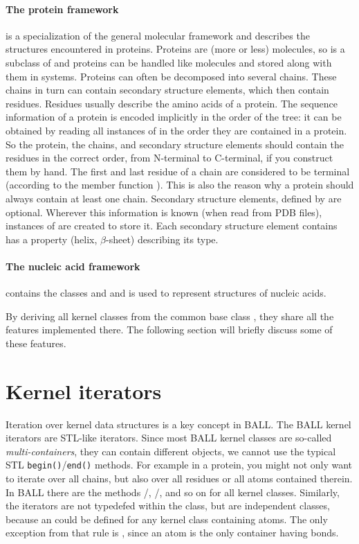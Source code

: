 \paragraph{The protein framework}is a specialization of the general molecular
framework and describes the structures encountered in proteins. Proteins are
(more or less) molecules, so  is a subclass of 
and proteins can be handled like molecules and stored along with them in
systems. Proteins can often be decomposed into several chains. These chains in
turn can contain secondary structure elements, which then contain residues.
Residues usually describe the amino acids of a protein. The sequence
information of a protein is encoded implicitly in the order of the tree: it
can be obtained by reading all instances of  in the order they
are contained in a protein. So the protein, the chains, and secondary
structure elements should contain the residues in the correct order, from
N-terminal to C-terminal, if you construct them by hand. The first and last
residue of a chain are considered to be terminal (according to the member
function ). This is also the reason why a protein
should always contain at least one chain. Secondary structure elements,
defined by  are optional. Wherever this information
is known (\eg when read from PDB files), instances of
 are created to store it. Each secondary structure
element contains has a property (\eg helix, $\beta$-sheet) describing its type.

\paragraph{The nucleic acid framework}contains the classes 
and  and is used to represent structures of nucleic acids.

By deriving all kernel classes from the common base class ,
they share all the features implemented there. The following section will
briefly discuss some of these features.

\section{Kernel iterators}
Iteration over kernel data structures is a key concept in BALL.
The BALL kernel iterators are STL-like iterators. Since most BALL kernel
classes are so-called {\em multi-containers}, \ie they can contain different
objects, we cannot use the typical STL {\tt begin()}/{\tt end()} methods.
For example in a protein, you might not only want to iterate over all chains,
but also over all residues or all atoms contained therein. In BALL there
are the methods /,
/, and so on for all
kernel classes. Similarly, the iterators are not typedefed within the class,
but are independent classes, because an  could be defined
for any kernel class containing atoms. The only exception from that rule
is , since an atom is the only container having
bonds.

